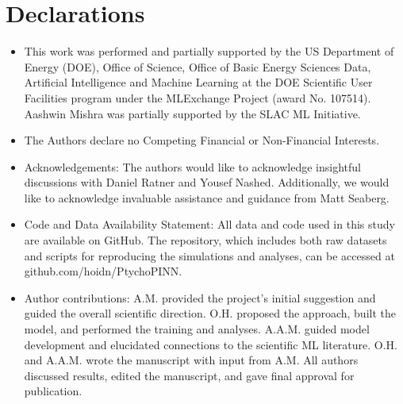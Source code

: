 \documentclass[sn-mathphys]{sn-jnl}%
\theoremstyle{thmstyleone}%
\theoremstyle{thmstyletwo}%
\theoremstyle{thmstylethree}%
\begin{document}


\backmatter


\section*{Declarations}

\begin{itemize}
\item This work was performed and partially supported by the US Department of Energy (DOE), Office of Science, Office of Basic Energy Sciences Data, Artificial Intelligence and Machine Learning at the DOE Scientific User Facilities program under the MLExchange Project (award No. 107514). Aashwin Mishra was partially supported by the SLAC ML Initiative.
\item The Authors declare no Competing Financial or Non-Financial Interests.
\item Acknowledgements: The authors would like to acknowledge insightful discussions with Daniel Ratner and Yousef Nashed. Additionally, we would like to acknowledge invaluable assistance and guidance from Matt Seaberg.
\item Code and Data Availability Statement: All data and code used in this study are available on GitHub. The repository, which includes both raw datasets and scripts for reproducing the simulations and analyses, can be accessed at github.com/hoidn/PtychoPINN. 
\item Author contributions: A.M. provided the project's initial suggestion and guided the overall scientific direction. O.H. proposed the approach, built the model, and performed the training and analyses. A.A.M. guided model development and elucidated connections to the scientific ML literature. O.H. and A.A.M. wrote the manuscript with input from A.M. All authors discussed results, edited the manuscript, and gave final approval for publication. 
\end{itemize}
\end{document}
